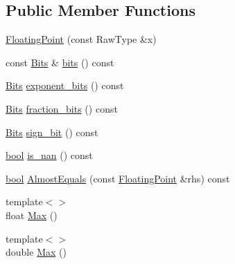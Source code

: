 \subsection*{Public Member Functions}
\begin{DoxyCompactItemize}
\item 
\hyperlink{classtesting_1_1internal_1_1FloatingPoint_a0dabf840863e0df84046f171c891fe71}{Floating\+Point} (const Raw\+Type \&x)
\item 
const \hyperlink{classtesting_1_1internal_1_1FloatingPoint_abf228bf6cd48f12c8b44c85b4971a731}{Bits} \& \hyperlink{classtesting_1_1internal_1_1FloatingPoint_aab053be914bdc9e507c0db89740c318c}{bits} () const
\item 
\hyperlink{classtesting_1_1internal_1_1FloatingPoint_abf228bf6cd48f12c8b44c85b4971a731}{Bits} \hyperlink{classtesting_1_1internal_1_1FloatingPoint_af6bf8fab8df572ecb137a3516ff390ae}{exponent\+\_\+bits} () const
\item 
\hyperlink{classtesting_1_1internal_1_1FloatingPoint_abf228bf6cd48f12c8b44c85b4971a731}{Bits} \hyperlink{classtesting_1_1internal_1_1FloatingPoint_aa17337e50a2ac855719bc0676529558f}{fraction\+\_\+bits} () const
\item 
\hyperlink{classtesting_1_1internal_1_1FloatingPoint_abf228bf6cd48f12c8b44c85b4971a731}{Bits} \hyperlink{classtesting_1_1internal_1_1FloatingPoint_afb8a816bb598225d775caaf43a893ef0}{sign\+\_\+bit} () const
\item 
\hyperlink{classbool}{bool} \hyperlink{classtesting_1_1internal_1_1FloatingPoint_a1fc654fd206efa98e480aa1e034f30d5}{is\+\_\+nan} () const
\item 
\hyperlink{classbool}{bool} \hyperlink{classtesting_1_1internal_1_1FloatingPoint_a965214c1af2f9ac5adb1393794aa81e5}{Almost\+Equals} (const \hyperlink{classtesting_1_1internal_1_1FloatingPoint}{Floating\+Point} \&rhs) const
\item 
{\footnotesize template$<$$>$ }\\float \hyperlink{classtesting_1_1internal_1_1FloatingPoint_af2eda9331e679229a1baa3404b57b51d}{Max} ()
\item 
{\footnotesize template$<$$>$ }\\double \hyperlink{classtesting_1_1internal_1_1FloatingPoint_afc2e85c0e886cb13b2300e961c9a9648}{Max} ()
\end{DoxyCompactItemize}
